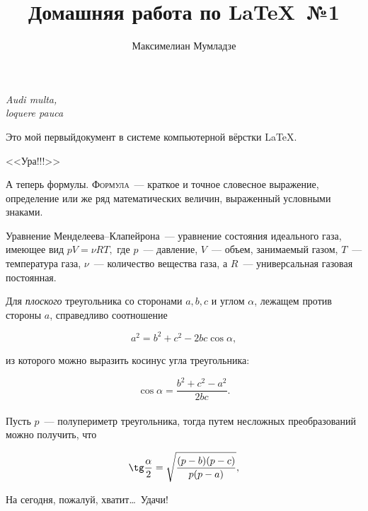 \documentclass[12pt]{article}
\title{Домашняя работа по \LaTeX ~№1}
\author{Максимелиан Мумладзе}
\date{}
\begin{document}
\maketitle

\begin{flushright}
\hfill\textit{Audi multa,\\loquere pauca}
\end{flushright}

\vspace{20pt}

Это мой первый\iffalse в кольце вычета $\approx 20$)\fi документ в системе компьютерной вёрстки \LaTeX.

\begin{center}
\Huge{\sffamily <<Ура!!!>>}
\end{center}

А теперь формулы. \textsc{Формула}~--- краткое и точное словесное выражение, определение или же ряд математических величин, выраженный условными знаками.

\vspace{15pt}

\hspace{28pt}{\large\bfseries Термодинамика}

Уравнение Менделеева--Клапейрона~--- уравнение состояния идеального газа, имеющее вид $pV = \nu RT,$ где $p$~--- давление, $V$~--- объем, занимаемый газом, $T$~--- температура газа, $\nu$~--- количество вещества газа, а $R$~--- универсальная газовая постоянная.

\vspace{15pt}

\hspace{28pt}{\large\bfseries Геометрия \hfill Планиметрия}

Для \textsl{плоского} треугольника со сторонами $a, b, c$ и углом $\alpha$, лежащем против стороны $a$, справедливо соотношение

$$
a^2 = b^2 + c^2 - 2 b c \cos\alpha,
$$

из которого можно выразить косинус угла треугольника:

$$
\cos\alpha = \frac{b^2 + c^2 - a^2}{2bc}.
$$\\

Пусть $p$~--- полупериметр треугольника, тогда путем несложных преобразований можно получить, что 

$$
\tg\frac{\alpha}{2} = \sqrt{\frac{(p - b)(p - c)}{p(p - a)}},
$$

\vspace{1cm}

\begin{flushleft}
На сегодня, пожалуй, хватит\dots ~Удачи!
\end{flushleft}
\end{document}
